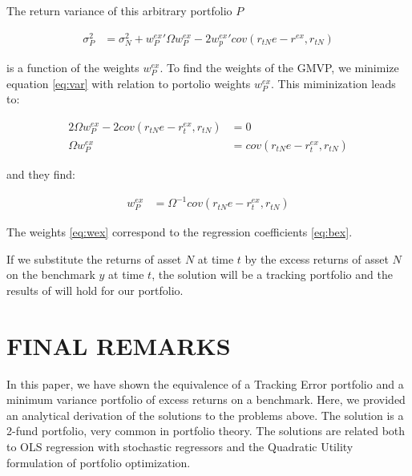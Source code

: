 \documentclass[12pt,oneside,a4paper]{memoir}
\begin{document}
The return variance of this arbitrary portfolio $P$

\begin{align}
	\label{eq:var}
\sigma^{2}_{P} &=
\sigma^{2}_{N} + w_{P}^{ex}' \Omega w_{P}^{ex} - 2w_{p}^{ex}' cov(r_{tN}e - r^{ex},r_{tN})
\end{align}

\noindent
is a function of the weights $w_{P}^{ex}$.
To find the weights of the GMVP, we minimize equation \eqref{eq:var} with relation to portolio weights $w_{P}^{ex}$.
This miminization leads to:

\begin{align*}
2 \Omega w_{P}^{ex} - 2 cov(r_{tN}e-r_{t}^{ex}, r_{tN}) &= 0 
\\
\Omega w_{P}^{ex} &= cov(r_{tN}e-r_{t}^{ex}, r_{tN})
\end{align*}

\noindent
and they find:

\begin{align}
	\label{eq:wex}
w_{P}^{ex} &= \Omega^{-1} cov(r_{tN}e-r_{t}^{ex}, r_{tN})
\end{align}

The weights \eqref{eq:wex} correspond to the regression coefficients \eqref{eq:bex}.

If we substitute the returns of asset $N$ at time $t$ by the excess returns of asset $N$ on the benchmark $y$ at time $t$, the solution will be a tracking portfolio and the results of  will hold for our portfolio.

\section{FINAL REMARKS}\label{section:conclusion}

In this paper, we have shown the equivalence of a Tracking Error portfolio and a minimum variance portfolio of excess returns on a benchmark.
Here, we provided an analytical derivation of the solutions to the problems above.
The solution is a 2-fund portfolio, very common in portfolio theory.
The solutions are related both to OLS regression with stochastic regressors and the Quadratic Utility formulation of portfolio optimization.
\end{document}
